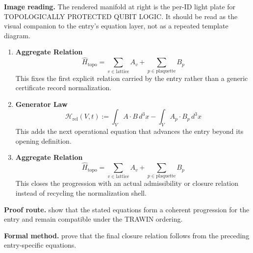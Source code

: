 \begin{samepage}
\noindent\begin{minipage}[t]{0.45\linewidth}
\vspace{0pt}
\raggedright
\scriptsize\textbf{Image reading.} The rendered manifold at right is the per-ID light plate for TOPOLOGICALLY PROTECTED QUBIT LOGIC. It should be read as the visual companion to the entry's equation layer, not as a repeated template diagram.\par
\end{minipage}\hfill
\begin{minipage}[t]{0.53\linewidth}
\vspace*{-0.10in}
\raggedright
{}
\end{minipage}
\end{samepage}

\clearpage


\begin{enumerate}[leftmargin=1.6em,itemsep=9pt,topsep=6pt]
\item \textbf{Aggregate Relation}
\[
\widehat{H}_{\mathrm{topo}} =
\sum_{v \in \mathrm{lattice}} A_v +
\sum_{p \in \mathrm{plaquette}} B_p
\]
This fixes the first explicit relation carried by the entry rather than a generic certificate record normalization.

\item \textbf{Generator Law}
\[
\mathcal{H}_{\mathrm{rel}}(V,t) :=
\int_V A\cdot B\,d^{3}x -
\int_V A_p\cdot B_p\,d^{3}x
\]
This adds the next operational equation that advances the entry beyond its opening definition.

\item \textbf{Aggregate Relation}
\[
\widehat{H}_{\mathrm{topo}} =
\sum_{v \in \mathrm{lattice}} A_v +
\sum_{p \in \mathrm{plaquette}} B_p
\]
This closes the progression with an actual admissibility or closure relation instead of recycling the normalization shell.
\end{enumerate}

\textbf{Proof route.} show that the stated equations form a coherent progression for the entry and remain compatible under the TRAWIN ordering.

\textbf{Formal method.} prove that the final closure relation follows from the preceding entry-specific equations.

